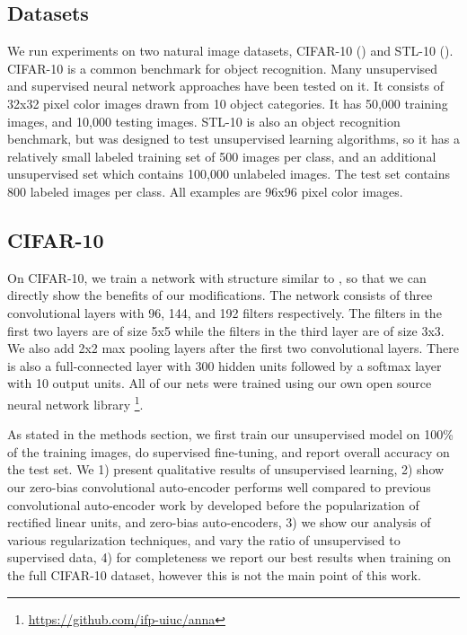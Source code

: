 \documentclass{article} \usepackage{iclr2015,times}
\begin{document}
\subsection{Datasets}
We run experiments on two natural image datasets, CIFAR-10 (\cite{krizhevsky2009learning}) and STL-10 (\cite{coates2011analysis}). CIFAR-10 is a common benchmark for object recognition. Many unsupervised and supervised neural network approaches have been tested on it. It consists of 32x32 pixel color images drawn from 10 object categories. It has 50,000 training images, and 10,000 testing images. STL-10 is also an object recognition benchmark, but was designed to test unsupervised learning algorithms, so it has a relatively small labeled training set of 500 images per class, and an additional unsupervised set which contains 100,000 unlabeled images. The test set contains 800 labeled images per class. All examples are 96x96 pixel color images.

\subsection{CIFAR-10}

On CIFAR-10, we train a network with structure similar to \citet{masci2011stacked}, so that we can directly show the benefits of our modifications. The network consists of three convolutional layers with 96, 144, and 192 filters respectively. The filters in the first two layers are of size 5x5 while the filters in the third layer are of size 3x3. We also add 2x2 max pooling layers after the first two convolutional layers. There is also a full-connected layer with 300 hidden units followed by a softmax layer with 10 output units. All of our nets were trained using our own open source neural network library \footnote{\url{https://github.com/ifp-uiuc/anna}}.

As stated in the methods section, we first train our unsupervised model on 100\% of the training images, do supervised fine-tuning, and report overall accuracy on the test set. We 1) present qualitative results of unsupervised learning, 2) show our zero-bias convolutional auto-encoder performs well compared to previous convolutional auto-encoder work by \citet{masci2011stacked} developed before the popularization of rectified linear units, and zero-bias auto-encoders, 3) we show our analysis of various regularization techniques, and vary the ratio of unsupervised to supervised data, 4) for completeness we report our best results when training on the full CIFAR-10 dataset, however this is not the main point of this work.
\end{document}
